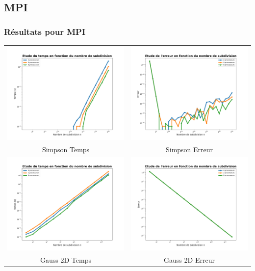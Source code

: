 \documentclass[10pt]{beamer}
\begin{document}


\subsection{MPI}

\begin{frame}
    \frametitle{Résultats pour MPI}
        \small
    \begin{tabular}{cc}
        \includegraphics[width=0.45\linewidth]{../Images/time_simp_MPI.png} &
        \includegraphics[width=0.45\linewidth]{../Images/error_simp_MPI.png} \\
        Simpson Temps & Simpson Erreur \\
        \includegraphics[width=0.45\linewidth]{../Images/time_gauss_MPI.png} &
        \includegraphics[width=0.45\linewidth]{../Images/error_gauss_MPI.png} \\
        Gauss 2D Temps & Gauss 2D Erreur \\
    \end{tabular}
        
\end{frame}
\end{document}
